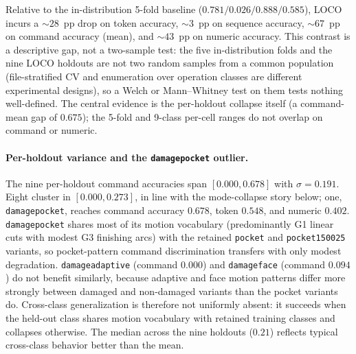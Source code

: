 \documentclass[sensors,article,submit,moreauthors,pdftex]{Definitions/mdpi}
\begin{document}
Relative to the in-distribution 5-fold baseline ($0.781 / 0.026 / 0.888 / 0.585$), LOCO incurs a $\sim$$28$~pp drop on token accuracy, $\sim$$3$~pp on sequence accuracy, $\sim$$67$~pp on command accuracy (mean), and $\sim$$43$~pp on numeric accuracy. This contrast is a descriptive gap, not a two-sample test: the five in-distribution folds and the nine LOCO holdouts are not two random samples from a common population (file-stratified CV and enumeration over operation classes are different experimental designs), so a Welch or Mann--Whitney test on them tests nothing well-defined. The central evidence is the per-holdout collapse itself (a command-mean gap of $0.675$); the 5-fold and 9-class per-cell ranges do not overlap on command or numeric.

\paragraph{Per-holdout variance and the \texttt{damagepocket} outlier.} The nine per-holdout command accuracies span $[0.000, 0.678]$ with $\sigma = 0.191$. Eight cluster in $[0.000, 0.273]$, in line with the mode-collapse story below; one, \texttt{damagepocket}, reaches command accuracy $0.678$, token $0.548$, and numeric $0.402$. \texttt{damagepocket} shares most of its motion vocabulary (predominantly G1 linear cuts with modest G3 finishing arcs) with the retained \texttt{pocket} and \texttt{pocket150025} variants, so pocket-pattern command discrimination transfers with only modest degradation. \texttt{damageadaptive} (command $0.000$) and \texttt{damageface} (command $0.094$) do not benefit similarly, because adaptive and face motion patterns differ more strongly between damaged and non-damaged variants than the pocket variants do. Cross-class generalization is therefore not uniformly absent: it succeeds when the held-out class shares motion vocabulary with retained training classes and collapses otherwise. The median across the nine holdouts ($0.21$) reflects typical cross-class behavior better than the mean.
\end{document}
